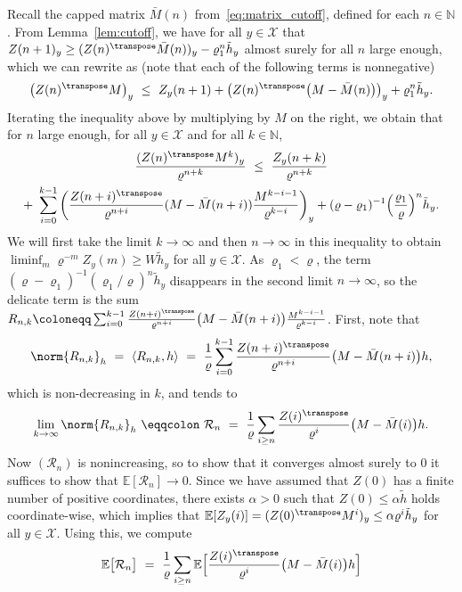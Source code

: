 \begin{refsegment}
Recall the capped matrix $\bar{M}(n)$ from~\eqref{eq:matrix_cutoff}, defined for each $n\in \mathbb{N}$.
From Lemma~\ref{lem:cutoff}, we have for all $y\in\mathcal{X}$ that $Z(n+1)_y \geq (Z(n)^\transpose \bar{M}(n))_y - \varrho_1^n\tilde{h}_y$ almost surely for all $n$ large enough, which we can rewrite as (note that each of the following terms is nonnegative)
\[
  \big(Z(n)^\transpose M\big)_y\ \leq\ Z_y(n+1) + \big(Z(n)^\transpose \big(M-\bar{M}(n)\big)\big)_y + \varrho_1^n\tilde{h}_y.
\]
Iterating the inequality above by multiplying by $M$ on the right, we obtain that for $n$ large enough, for all $y\in \mathcal{X}$ and for all $k\in \mathbb{N}$,
%
\begin{multline}\label{eq:ineq_iii_c}
  \frac{(Z(n)^\transpose M^k)_y}{\varrho^{n+k}}\ \leq\  \frac{Z_y(n+k)}{\varrho^{n+k}}\\ +\ \sum_{i=0}^{k-1}\bigg(\frac{Z(n+i)^\transpose}{\varrho^{n+i}}(M-\bar{M}(n+i))\frac{M^{k-i-1}}{\varrho^{k-i}}\bigg)_y + (\varrho-\varrho_1)^{-1}\Big(\frac{\varrho_1}{\varrho}\Big)^n\tilde{h}_y.
\end{multline}
%
We will first take the limit $k\to \infty$ and then $n\to \infty$ in this inequality to obtain $\liminf_{m}\varrho^{-m}Z_y(m) \geq W\tilde{h}_y$ for all $y\in \mathcal{X}$.
As $\varrho_1<\varrho$, the term $(\varrho-\varrho_1)^{-1}(\varrho_1/\varrho)^n\tilde{h}_y$ disappears in the second limit $n\to\infty$, so the delicate term is the sum $R_{n,k}\coloneqq \sum_{i=0}^{k-1}\frac{Z(n+i)^\transpose}{\varrho^{n+i}}\big(M-\bar{M}(n+i)\big)\frac{M^{k-i-1}}{\varrho^{k-i}}$.
First, note that
\[
   \norm{R_{n,k}}_h\ =\ \langle R_{n,k},h\rangle \ =\ \frac{1}{\varrho}\sum_{i=0}^{k-1} \frac{Z(n+i)^\transpose}{\varrho^{n+i}}\big(M-\bar{M}(n+i)\big) h,
\]
which is non-decreasing in $k$, and tends to
\[
  \lim_{k\to \infty}\norm{R_{n,k}}_h \ \eqqcolon\ \mathcal{R}_n \ =\ \frac{1}{\varrho}\sum_{i\geq n} \frac{Z(i)^\transpose}{\varrho^{i}}\big(M-\bar{M}(i)\big) h.
\]
Now $(\mathcal{R}_n)$ is nonincreasing, so to show that it converges almost surely to $0$ it suffices to show that $\mathbb{E}[\mathcal{R}_n]\to 0$.
Since we have assumed that $Z(0)$ has a finite number of positive coordinates, there exists $\alpha > 0$ such that $Z(0) \leq \alpha \tilde{h}$ holds coordinate-wise, which implies that $\mathbb{E}[Z_y(i)] =(Z(0)^\transpose M^i)_y\leq \alpha \varrho^i \tilde{h}_y$ for all $y\in \mathcal{X}$.
Using this, we compute
\begin{align}\nonumber
  \mathbb{E}\big[ \mathcal{R}_n\big]\ &=\ \frac{1}{\varrho}\sum_{i\geq n}\mathbb{E}\Big[\frac{Z(i)^\transpose}{\varrho^{i}}\big(M-\bar{M}(i)\big)h \Big] \\

\end{align}
\end{refsegment}
